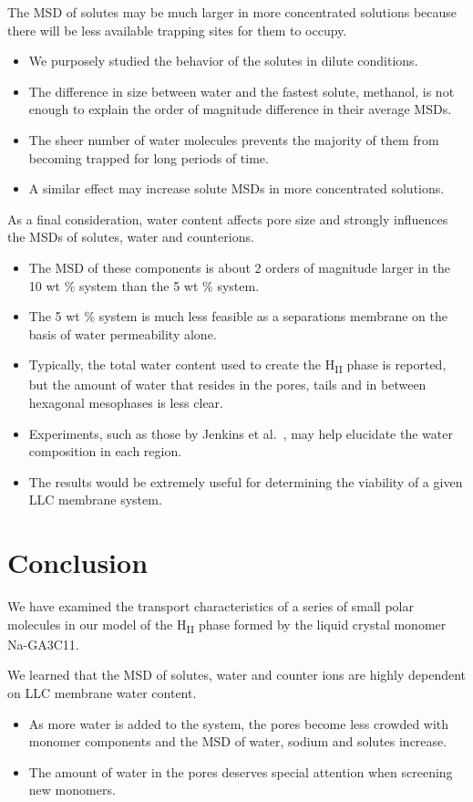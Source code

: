 \documentclass{article}
\begin{document}
  The MSD of solutes may be much larger in more concentrated solutions because there
  will be less available trapping sites for them to occupy.
  \begin{itemize}
    \item We purposely studied the behavior of the solutes in dilute conditions.
    \item The difference in size between water and the fastest solute, methanol, is not
    enough to explain the order of magnitude difference in their average MSDs.
    \item The sheer number of water molecules prevents the majority of them from 
    becoming trapped for long periods of time.
    \item A similar effect may increase solute MSDs in more concentrated solutions.
  \end{itemize}
  
  As a final consideration, water content affects pore size and strongly influences
  the MSDs of solutes, water and counterions.
  \begin{itemize}
    \item The MSD of these components is about 2 orders of magnitude larger in the 
    10 wt \% system than the 5 wt \% system.
    \item The 5 wt \% system is much less feasible as a separations membrane on the basis
    of water permeability alone.
    \item Typically, the total water content used to create the H\textsubscript{II} phase
    is reported, but the amount of water that resides in the pores, tails and in between
    hexagonal mesophases is less clear.
    \item Experiments, such as those by Jenkins et al.~\cite{jenkins_identification_2012}, 
    may help elucidate the water composition in each region.
    \item The results would be extremely useful for determining the viability of a given
    LLC membrane system. 
  \end{itemize}

  \section{Conclusion}

  We have examined the transport characteristics of a series of small polar
  molecules in our model of the H\textsubscript{II} phase formed by the liquid 
  crystal monomer Na-GA3C11.

  We learned that the MSD of solutes, water and counter ions are highly dependent 
  on LLC membrane water content.
  \begin{itemize}
    \item As more water is added to the system, the pores become less crowded
    with monomer components and the MSD of water, sodium and solutes increase.
    \item The amount of water in the pores deserves special attention when 
    screening new monomers.
  \end{itemize}
\end{document}
